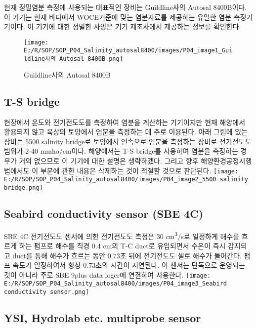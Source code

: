\documentclass[
]{book}
\begin{document}
현재 정밀염분 측정에 사용되는 대표적인 장비는 Guildline사의 Autosal 8400B이다. 이 기기는 현재 바다에서 WOCE기준에 맞는 염분자료를 제공하는 유일한 염분 측정기기이다. 이 기기에 대한 정밀한 사양은 기기 제조사에서 제공하는 정보를 확인한다.

\begin{figure}
\centering
\texttt{[image: E:/R/SOP/SOP\_P04\_Salinity\_autosal8400/images/P04\_image1\_Guildline사의 Autosal 8400B.png]}
\caption{Guildline사의 Autosal 8400B}
\end{figure}

\hypertarget{t-s-bridge}{%
\subsection{T-S bridge}\label{t-s-bridge}}

현장에서 온도와 전기전도도를 측정하여 염분을 계산하는 기기이지만 현재 해양에서 활용되지 않고 육상의 토양에서 염분을 측정하는 데 주로 이용된다. 아래 그림에 있는 장비는 5500 salinity bridge로 토양에서 연속으로 염분을 측정하는 장비로 전기전도도 범위가 2-40 mmho/cm이다. 해양에서는 T-S bridge를 사용하여 염분을 측정하는 경우가 거의 없으므로 이 기기에 대한 설명은 생략하겠다. 그리고 향후 해양환경공정시행법에서도 이 부분에 관한 내용은 삭제하는 것이 적절할 것으로 판단된다.
\texttt{[image: E:/R/SOP/SOP\_P04\_Salinity\_autosal8400/images/P04\_image2\_5500 salinity bridge.png]}

\hypertarget{seabird-conductivity-sensor-sbe-4c}{%
\subsection{Seabird conductivity sensor (SBE 4C)}\label{seabird-conductivity-sensor-sbe-4c}}

SBE 4C 전기전도도 센서에 의한 전기전도도 측정은 30 cm\textsuperscript{3}/s로 일정하게 해수를 흐르게 하는 펌프로 해수를 직경 0.4 cm의 T-C duct로 유입되면서 수온이 즉시 감지되고 duct를 통해 해수가 흐르는 동안 0.73초 뒤에 전기전도도 셀로 해수가 들어간다. 펌프 속도가 일정하여서 항상 0.73초의 시간이 지연된다. 이 센서는 단독으로 운영되는 것이 아니라 주로 SBE 9plus data loger에 연결하여 사용한다.
\texttt{[image: E:/R/SOP/SOP\_P04\_Salinity\_autosal8400/images/P04\_image3\_Seabird conductivity sensor.png]}

\hypertarget{ysi-hydrolab-etc.-multiprobe-sensor}{%
\subsection{YSI, Hydrolab etc. multiprobe sensor}\label{ysi-hydrolab-etc.-multiprobe-sensor}}
\end{document}
